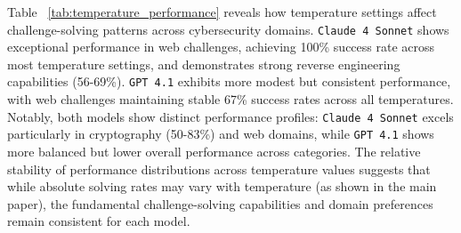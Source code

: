 Table ~\ref{tab:temperature_performance} reveals how temperature settings affect challenge-solving patterns across cybersecurity domains. \texttt{Claude 4 Sonnet} shows exceptional performance in web challenges, achieving 100\% success rate across most temperature settings, and demonstrates strong reverse engineering capabilities (56-69\%). \texttt{GPT 4.1} exhibits more modest but consistent performance, with web challenges maintaining stable 67\% success rates across all temperatures. Notably, both models show distinct performance profiles: \texttt{Claude 4 Sonnet} excels particularly in cryptography (50-83\%) and web domains, while \texttt{GPT 4.1} shows more balanced but lower overall performance across categories. The relative stability of performance distributions across temperature values suggests that while absolute solving rates may vary with temperature (as shown in the main paper), the fundamental challenge-solving capabilities and domain preferences remain consistent for each model.

